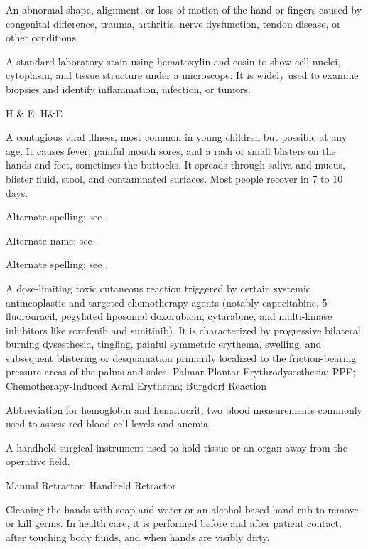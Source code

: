  An abnormal shape, alignment, or loss of motion of the hand or fingers caused by congenital difference, trauma, arthritis, nerve dysfunction, tendon disease, or other conditions.

 A standard laboratory stain using hematoxylin and eosin to show cell nuclei, cytoplasm, and tissue structure under a microscope. It is widely used to examine biopsies and identify inflammation, infection, or tumors.

\synonyms
H \& E; H\&E

 A contagious viral illness, most common in young children but possible at any age. It causes fever, painful mouth sores, and a rash or small blisters on the hands and feet, sometimes the buttocks. It spreads through saliva and mucus, blister fluid, stool, and contaminated surfaces. Most people recover in 7 to 10 days.

 Alternate spelling; see .

 Alternate name; see .

 Alternate spelling; see .

 A dose-limiting toxic cutaneous reaction triggered by certain systemic antineoplastic and targeted chemotherapy agents (notably capecitabine, 5-fluorouracil, pegylated liposomal doxorubicin, cytarabine, and multi-kinase inhibitors like sorafenib and sunitinib). It is characterized by progressive bilateral burning dysesthesia, tingling, painful symmetric erythema, swelling, and subsequent blistering or desquamation primarily localized to the friction-bearing pressure areas of the palms and soles.
\synonyms
Palmar-Plantar Erythrodysesthesia; PPE; Chemotherapy-Induced Acral Erythema; Burgdorf Reaction

 Abbreviation for hemoglobin and hematocrit, two blood measurements commonly used to assess red-blood-cell levels and anemia.

 A handheld surgical instrument used to hold tissue or an organ away from the operative field.

\synonyms
Manual Retractor; Handheld Retractor

 Cleaning the hands with soap and water or an alcohol-based hand rub to remove or kill germs. In health care, it is performed before and after patient contact, after touching body fluids, and when hands are visibly dirty.

